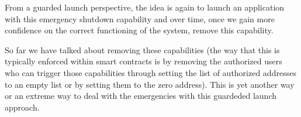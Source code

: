 From a guarded launch perspective, the idea is again to launch an
application with this emergency shutdown capability and over time, once
we gain more confidence on the correct functioning of the system, remove
this capability.

So far we have talked about removing these capabilities (the way that
this is typically enforced within smart contracts is by removing the
authorized users who can trigger those capabilities through setting the
list of authorized addresses to an empty list or by setting them to the
zero address). This is yet another way or an extreme way to deal with
the emergencies with this guardeded launch approach.
